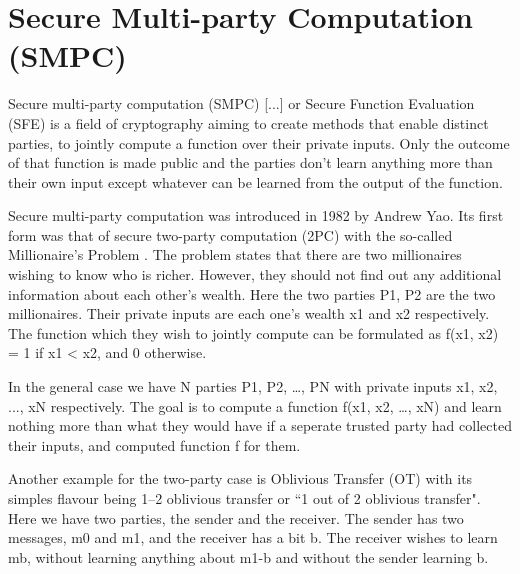 \section{Secure Multi-party Computation (SMPC)}\label{s:smpc}
Secure multi-party computation (SMPC) [...] or Secure Function Evaluation (SFE) is a field of cryptography aiming to create methods that enable distinct parties, to jointly compute a function over their private inputs.
Only the outcome of that function is made public and the parties don’t learn anything more than their own input except whatever can be learned from the output of the function.

Secure multi-party computation was introduced in 1982 by Andrew Yao.
Its first form was that of secure two-party computation (2PC) with the so-called Millionaire's Problem \cite{yao1982protocols}.
The problem states that there are two millionaires wishing to know who is richer.
However, they should not find out any additional information about each other’s wealth.
Here the two parties P1, P2 are the two millionaires.
Their private inputs are each one’s wealth x1 and x2 respectively.
The function which they wish to jointly compute can be formulated as f(x1, x2) = 1 if x1 < x2, and 0 otherwise.

In the general case we have N parties P1, P2, …, PN with private inputs x1, x2, ..., xN respectively.
The goal is to compute a function f(x1, x2, …, xN) and learn nothing more than what they would have if a seperate trusted party had collected their inputs, and computed function f for them.

Another example for the two-party case is Oblivious Transfer (OT) with its simples flavour being 1–2 oblivious transfer or ``1 out of 2 oblivious transfer".
Here we have two parties, the sender and the receiver.
The sender has two messages, m0 and m1, and the receiver has a bit b. The receiver wishes to learn mb, without learning anything about m1-b and without the sender learning b.